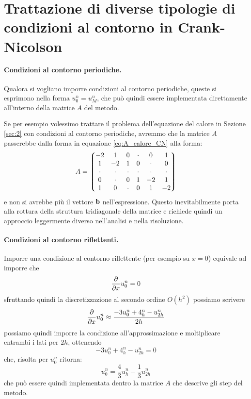 \documentclass[10pt,a4paper]{article}
\begin{document}

\section{Trattazione di diverse tipologie di condizioni al contorno in Crank-Nicolson}
\label{app:boundaries}
\paragraph{Condizioni al contorno periodiche.}
Qualora si vogliano imporre condizioni al contorno periodiche, queste si esprimono nella forma $u_0^n = u_M^n$, che può quindi essere implementata direttamente all'interno della matrice $A$ del metodo.

Se per esempio volessimo trattare il problema dell'equazione del calore in Sezione \ref{sec:2} con condizioni al contorno periodiche, avremmo che la matrice $A$ passerebbe dalla forma in equazione \eqref{eq:A_calore_CN} alla forma:
\begin{equation}
	A = \mqty*(-2 & 1 & 0 & \cdot & 0 & 1 \\ 1 & -2 & 1 & 0 & \cdot & 0 \\ \cdot & \cdot & \cdot & \cdot & \cdot & \cdot \\ 0 & \cdot & 0 & 1 & -2 & 1 \\ 1 & 0 & \cdot & 0 & 1 & -2)
\end{equation}
e non si avrebbe più il vettore $\vb{b}$ nell'espressione. Questo inevitabilmente porta alla rottura della struttura tridiagonale della matrice e richiede quindi un approccio leggermente diverso nell'analisi e nella risoluzione.

\paragraph{Condizioni al contorno riflettenti.}
Imporre una condizione al contorno riflettente (per esempio su $x=0$) equivale ad imporre che
\begin{equation}
	\pdv{}{x} u_0^n = 0
\end{equation}
sfruttando quindi la discretizzazione al secondo ordine $O(h^2)$ possiamo scrivere
\begin{equation}
	\pdv{}{x}u_0^n \approx \frac{-3u_0^n + 4_h^n - u_{2h}^n}{2h}
\end{equation}
possiamo quindi imporre la condizione all'approssimazione e moltiplicare entrambi i lati per $2h$, ottenendo
\begin{equation}
	-3u_0^n + 4_h^n - u_{2h}^n = 0
\end{equation}
che, risolta per $u_0^n$ ritorna:
\begin{equation}
	u_0^n = \frac{4}{3}u_{h}^n - \frac{1}{3}u_{2h}^n
\end{equation}
che può essere quindi implementata dentro la matrice $A$ che descrive gli step del metodo.
\end{document}
